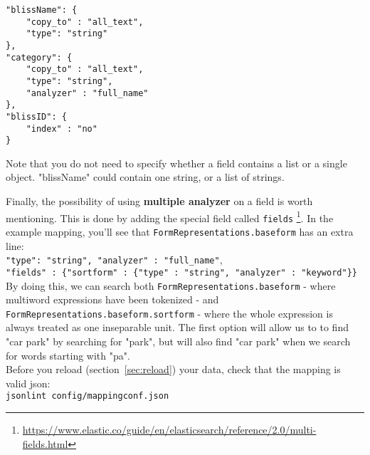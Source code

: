 \documentclass[
12pt, %
a4paper, %
oneside, %
headinclude,footinclude, %
BCOR0mm, %
]{scrartcl}
\begin{document}
   \begin{verbatim}
"blissName": {
    "copy_to" : "all_text",
    "type": "string"
},
"category": {
    "copy_to" : "all_text",
    "type": "string",
    "analyzer" : "full_name"
},
"blissID": {
    "index" : "no"
}
   \end{verbatim}
   Note that you do not need to specify whether a field contains a list or a single object. "blissName"
   could contain one string, or a list of strings.

   Finally, the possibility of using \textbf{multiple analyzer} on a field is worth mentioning.
   This is done by adding
   the special field called \verb|fields|%
  \footnote{\url{https://www.elastic.co/guide/en/elasticsearch/reference/2.0/multi-fields.html}}.
   In the example mapping, you'll see that \verb|FormRepresentations.baseform| has an extra line:\\
       \verb|"type": "string", "analyzer" : "full_name"|,\\
       \verb|"fields" : {"sortform" : {"type" : "string", "analyzer" : "keyword"}}|\\
  By doing this, we can search both \verb|FormRepresentations.baseform| - where multiword expressions
  have been tokenized - and \verb|FormRepresentations.baseform.sortform| - where the whole
  expression is always treated as one inseparable unit. The first option will allow us to to
  find "car park" by searching for "park", but will also find "car park" when we search for words starting
  with "pa".\\

  Before you reload (section~\ref{sec:reload}) your data, check that the mapping
  is valid json:\\
  \verb|jsonlint config/mappingconf.json|
\end{document}
